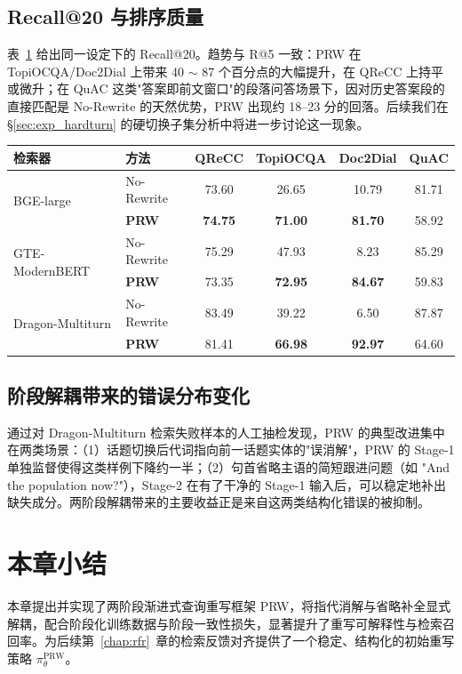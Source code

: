 \subsection{Recall@20 与排序质量}

表~\ref{tab:prw_main_r20} 给出同一设定下的 Recall@20。趋势与 R@5 一致：PRW 在 TopiOCQA/Doc2Dial 上带来 40 $\sim$ 87 个百分点的大幅提升，在 QReCC 上持平或微升；在 QuAC 这类"答案即前文窗口"的段落问答场景下，因对历史答案段的直接匹配是 No-Rewrite 的天然优势，PRW 出现约 18--23 分的回落。后续我们在 §\ref{sec:exp_hardturn} 的硬切换子集分析中将进一步讨论这一现象。

\begin{table}[h]
\centering
{}
\label{tab:prw_main_r20}
\small
\begin{tabular}{llcccc}
\toprule
检索器 & 方法 & QReCC & TopiOCQA & Doc2Dial & QuAC \\
\midrule
\multirow{2}{*}{BGE-large}
 & No-Rewrite & 73.60 & 26.65 & 10.79 & 81.71 \\
 & \textbf{PRW} & \textbf{74.75} & \textbf{71.00} & \textbf{81.70} & 58.92 \\
\midrule
\multirow{2}{*}{GTE-ModernBERT}
 & No-Rewrite & 75.29 & 47.93 & 8.23 & 85.29 \\
 & \textbf{PRW} & 73.35 & \textbf{72.95} & \textbf{84.67} & 59.83 \\
\midrule
\multirow{2}{*}{Dragon-Multiturn}
 & No-Rewrite & 83.49 & 39.22 & 6.50 & 87.87 \\
 & \textbf{PRW} & 81.41 & \textbf{66.98} & \textbf{92.97} & 64.60 \\
\bottomrule
\end{tabular}
\end{table}

\subsection{阶段解耦带来的错误分布变化}

通过对 Dragon-Multiturn 检索失败样本的人工抽检发现，PRW 的典型改进集中在两类场景：（1）话题切换后代词指向前一话题实体的"误消解"，PRW 的 Stage-1 单独监督使得这类样例下降约一半；（2）句首省略主语的简短跟进问题（如 "And the population now?"），Stage-2 在有了干净的 Stage-1 输入后，可以稳定地补出缺失成分。两阶段解耦带来的主要收益正是来自这两类结构化错误的被抑制。

\section{本章小结}

本章提出并实现了两阶段渐进式查询重写框架 PRW，将指代消解与省略补全显式解耦，配合阶段化训练数据与阶段一致性损失，显著提升了重写可解释性与检索召回率。为后续第~\ref{chap:rfr}~章的检索反馈对齐提供了一个稳定、结构化的初始重写策略 $\pi^{\text{PRW}}_\theta$。
